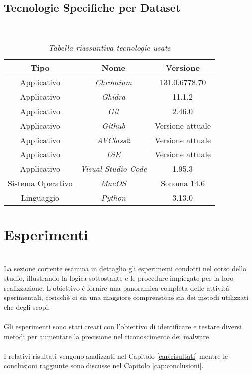 \subsection{Tecnologie Specifiche per Dataset}
~\\
\hfill
\begin{table}[!h]
    \centering
    \begin{tabular}{|c|c|c|}
        \hline
        \textbf{Tipo} & \textbf{Nome} & \textbf{Versione} \\
        \hline
        Applicativo & \emph{Chromium} & 131.0.6778.70 \\
        \hline
        Applicativo & \emph{Ghidra} & 11.1.2 \\
        \hline
        Applicativo & \emph{Git} & 2.46.0 \\
        \hline
        Applicativo & \emph{Github} & Versione attuale \\
        \hline
        Applicativo & \emph{AVClass2} & Versione attuale \\
        \hline
        Applicativo & \emph{DiE} & Versione attuale \\
        \hline
        Applicativo & \emph{Visual Studio Code} & 1.95.3 \\
        \hline
        Sistema Operativo & \emph{MacOS} & Sonoma 14.6 \\
        \hline
        Linguaggio & \emph{Python} & 3.13.0 \\
        \hline
    \end{tabular}
    \caption{\emph{Tabella riassuntiva tecnologie usate}}
    \label{table-tecnologie}
\end{table}

\section{Esperimenti}
~\\
\indent La sezione corrente esamina in dettaglio gli esperimenti condotti nel corso dello studio, illustrando la logica sottostante e le procedure impiegate per la loro realizzazione. 
L'obiettivo è fornire una panoramica completa delle attività sperimentali, cosicchè ci sia una maggiore comprensione sia dei metodi utilizzati che degli scopi.
\\\\
Gli esperimenti sono stati creati con l'obiettivo di identificare e testare diversi metodi per aumentare la precisione nel riconoscimento dei malware.
\\\\
I relativi risultati vengono analizzati nel Capitolo \ref{cap:risultati} mentre le conclusioni raggiunte sono discusse nel Capitolo \ref{cap:conclusioni}.

